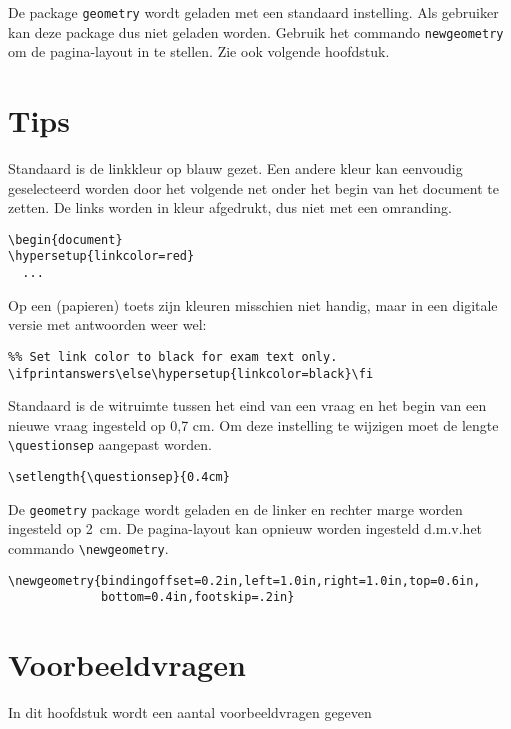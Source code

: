 \documentclass[12pt,dutch,addpoints,fleqn]{tisdexam}
\begin{document}
\medskip
De package \verb|geometry| wordt geladen met een standaard instelling. Als
gebruiker kan deze package dus niet geladen worden. Gebruik het commando
\verb|newgeometry| om de pagina-layout in te stellen. Zie ook volgende
hoofdstuk.


\section{Tips}
Standaard is de linkkleur op blauw gezet. Een andere kleur kan eenvoudig
geselecteerd worden door het volgende net onder het begin van het document
te zetten. De links worden in kleur afgedrukt, dus niet met een omranding.

\begin{lstlisting}
\begin{document}
\hypersetup{linkcolor=red}
  ...
\end{lstlisting}

\medskip
Op een (papieren) toets zijn kleuren misschien niet handig, maar in een
digitale versie met antwoorden weer wel:

\begin{lstlisting}
%% Set link color to black for exam text only.
\ifprintanswers\else\hypersetup{linkcolor=black}\fi
\end{lstlisting}

\medskip
Standaard is de witruimte tussen het eind van een vraag en het begin van een
nieuwe vraag ingesteld op 0,7 cm. Om deze instelling te wijzigen moet de
lengte \verb|\questionsep| aangepast worden.

\begin{lstlisting}
\setlength{\questionsep}{0.4cm}
\end{lstlisting}

\medskip
De \verb|geometry| package wordt geladen en de linker en rechter marge worden
ingesteld op 2~cm. De pagina-layout kan opnieuw worden ingesteld
d.m.v.\@ het commando \verb|\newgeometry|.

\begin{lstlisting}
\newgeometry{bindingoffset=0.2in,left=1.0in,right=1.0in,top=0.6in,
             bottom=0.4in,footskip=.2in}
\end{lstlisting}

\section{Voorbeeldvragen}
In dit hoofdstuk wordt een aantal voorbeeldvragen gegeven
\end{document}
